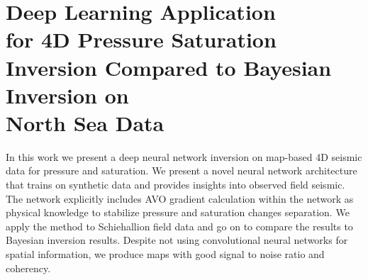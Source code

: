 \chapter[Deep Learning Application for 4D Pressure Saturation Inversion Compared to Bayesian Inversion on North Sea Data]{Deep Learning Application\\for 4D Pressure Saturation Inversion Compared to Bayesian Inversion on\\North Sea Data}

In this work we present a deep neural network inversion on map-based 4D seismic data for pressure and saturation. We present a novel neural network architecture that trains on synthetic data and provides insights into observed field seismic. The network explicitly includes AVO gradient calculation within the network as physical knowledge to stabilize pressure and saturation changes separation. We apply the method to Schiehallion field data and go on to compare the results to Bayesian inversion results. Despite not using convolutional neural networks for spatial information, we produce maps with good signal to noise ratio and coherency.

{\vfill\hfill\newline{}}


